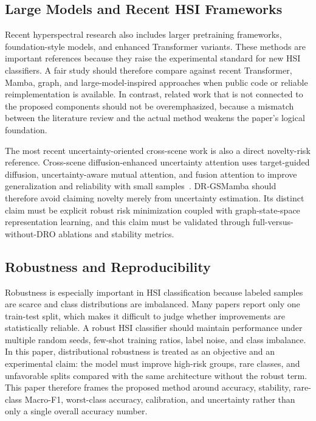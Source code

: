 \subsection{Large Models and Recent HSI Frameworks}
Recent hyperspectral research also includes larger pretraining frameworks, foundation-style models, and enhanced Transformer variants. These methods are important references because they raise the experimental standard for new HSI classifiers. A fair study should therefore compare against recent Transformer, Mamba, graph, and large-model-inspired approaches when public code or reliable reimplementation is available. In contrast, related work that is not connected to the proposed components should not be overemphasized, because a mismatch between the literature review and the actual method weakens the paper's logical foundation.

The most recent uncertainty-oriented cross-scene work is also a direct novelty-risk reference. Cross-scene diffusion-enhanced uncertainty attention uses target-guided diffusion, uncertainty-aware mutual attention, and fusion attention to improve generalization and reliability with small samples~\cite{wang2026cduan}. DR-GSMamba should therefore avoid claiming novelty merely from uncertainty estimation. Its distinct claim must be explicit robust risk minimization coupled with graph-state-space representation learning, and this claim must be validated through full-versus-without-DRO ablations and stability metrics.

\subsection{Robustness and Reproducibility}
Robustness is especially important in HSI classification because labeled samples are scarce and class distributions are imbalanced. Many papers report only one train-test split, which makes it difficult to judge whether improvements are statistically reliable. A robust HSI classifier should maintain performance under multiple random seeds, few-shot training ratios, label noise, and class imbalance. In this paper, distributional robustness is treated as an objective and an experimental claim: the model must improve high-risk groups, rare classes, and unfavorable splits compared with the same architecture without the robust term. This paper therefore frames the proposed method around accuracy, stability, rare-class Macro-F1, worst-class accuracy, calibration, and uncertainty rather than only a single overall accuracy number.
